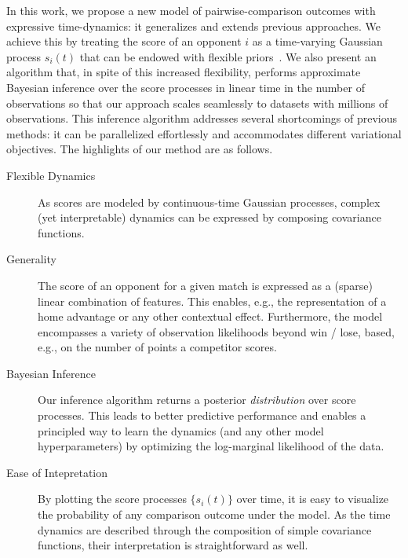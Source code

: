 In this work, we propose a new model of pairwise-comparison outcomes with expressive time-dynamics: it generalizes and extends previous approaches.
We achieve this by treating the score of an opponent $i$ as a time-varying Gaussian process $s_i(t)$ that can be endowed with flexible priors~\citep{rasmussen2006gaussian}.
We also present an algorithm that, in spite of this increased flexibility, performs approximate Bayesian inference over the score processes in linear time in the number of observations so that our approach scales seamlessly to datasets with millions of observations.
This inference algorithm addresses several shortcomings of previous methods: it can be parallelized effortlessly and accommodates different variational objectives.
The highlights of our method are as follows.

\begin{description}
\item[Flexible Dynamics]
As scores are modeled by continuous-time Gaussian processes, complex (yet interpretable) dynamics can be expressed by composing covariance functions.

\item[Generality]
The score of an opponent for a given match is expressed as a (sparse) linear combination of features.
This enables, e.g., the representation of a home advantage or any other contextual effect.
Furthermore, the model encompasses a variety of observation likelihoods beyond win / lose, based, e.g., on the number of points a competitor scores.

\item[Bayesian Inference]
Our inference algorithm returns a posterior \emph{distribution} over score processes.
This leads to better predictive performance and enables a principled way to learn the dynamics (and any other model hyperparameters) by optimizing the log-marginal likelihood of the data.

\item[Ease of Intepretation]
By plotting the score processes $\{ s_i(t) \}$ over time, it is easy to visualize the probability of any comparison outcome under the model.
As the time dynamics are described through the composition of simple covariance functions, their interpretation is straightforward as well.
\end{description}

